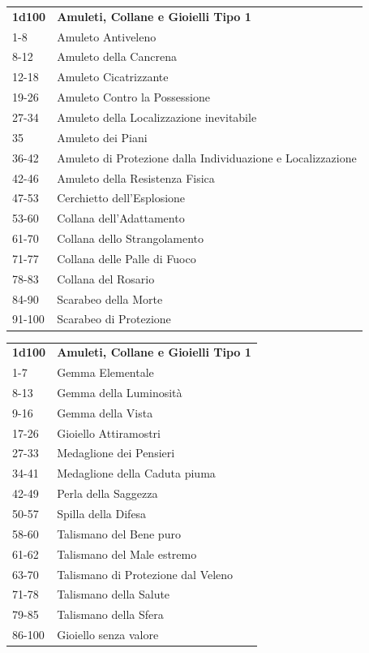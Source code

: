 \begin{multicols}{2}
	\medskip

	\begin{tabularx}{0.45\textwidth}{lX}
		\textbf{1d100} & \textbf{Amuleti, Collane e Gioielli Tipo 1}\\
		1-8   & Amuleto Antiveleno\\
		8-12  & Amuleto della Cancrena\\
		12-18 & Amuleto Cicatrizzante\\
		19-26 & Amuleto Contro la Possessione\\
		27-34 & Amuleto della Localizzazione inevitabile\\
		35    & Amuleto dei Piani\\
		36-42 & Amuleto di Protezione dalla Individuazione e Localizzazione\\
		42-46 & Amuleto della Resistenza Fisica\\
		47-53 & Cerchietto dell'Esplosione\\
		53-60 & Collana dell'Adattamento\\
		61-70 & Collana dello Strangolamento\\
		71-77 & Collana delle Palle di Fuoco\\
		78-83 & Collana del Rosario\\
		84-90 & Scarabeo della Morte\\
		91-100 & Scarabeo di Protezione\\
	\end{tabularx}

	\medskip

	\begin{tabularx}{0.45\textwidth}{lX}
		\textbf{1d100} & \textbf{Amuleti, Collane e Gioielli Tipo 1}\\
		1-7 & Gemma Elementale\\
		8-13& Gemma della Luminosità\\
		9-16& Gemma della Vista\\
		17-26& Gioiello Attiramostri\\
		27-33& Medaglione dei Pensieri\\
		34-41& Medaglione della Caduta piuma\\
		42-49& Perla della Saggezza\\
		50-57& Spilla della Difesa\\
		58-60& Talismano del Bene puro\\
		61-62& Talismano del Male estremo\\
		63-70& Talismano di Protezione dal Veleno\\
		71-78& Talismano della Salute\\
		79-85& Talismano della Sfera\\
		86-100& Gioiello senza valore
	\end{tabularx}



\end{multicols}
